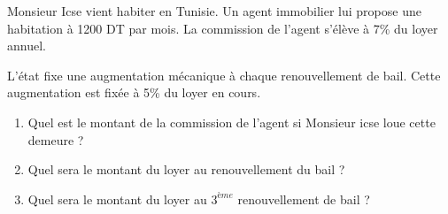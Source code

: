 
Monsieur Icse vient habiter en Tunisie. Un agent immobilier lui propose une habitation à 1200 DT par mois. La commission de l'agent s'élève à 7\% du loyer annuel.

L'état fixe une augmentation mécanique à chaque renouvellement de bail. Cette augmentation est fixée à 5\% du loyer en cours.

\begin{enumerate}
\item Quel est le montant de la commission de l'agent si Monsieur icse loue cette demeure ?
\item Quel sera le montant du loyer au renouvellement du bail ?
\item Quel sera le montant du loyer au $3^{ème}$ renouvellement de bail ?
\end{enumerate}  